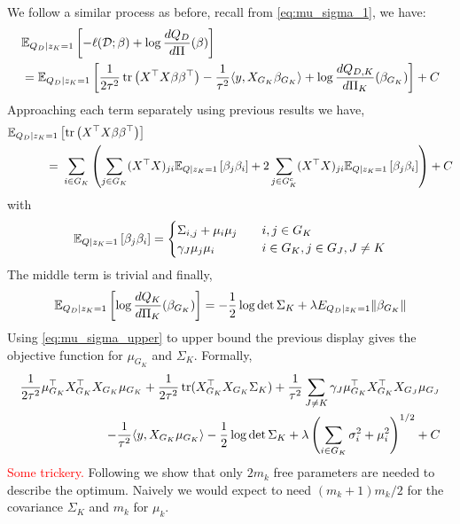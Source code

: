 \documentclass[12pt]{article}
\renewcommand{\red}[1]{\textcolor{red}{#1}}
\begin{document}
We follow a similar process as before, recall from \eqref{eq:mu_sigma_1}, we have:
{\allowdisplaybreaks
\begin{align}
& \mathbb{E}_{Q_D  | z_K = 1}  \left[ 
    - \ell(\mathcal{D}; \beta) + \log \frac{dQ_D}{d\Pi}(\beta) 
\right]  \nonumber \\
& = 
    \mathbb{E}_{Q_D | z_K = 1} \left[ 
	\frac{1}{2\tau^2} \operatorname{tr} \left( X^\top X \beta \beta^\top \right) 
	- \frac{1}{\tau^2} \langle y, X_{G_K} \beta_{G_K} \rangle 
	+ \log \frac{dQ_{D,K}}{d\Pi_K}(\beta_{G_K})
    \right] + C \label{eq:QD_mu_sigma}
\end{align}
}
Approaching each term separately using previous results we have,
\begin{align}
    \mathbb{E}_{Q_D | z_K = 1} & \left[ 
	\operatorname{tr} \left( X^\top X \beta \beta^\top \right) 
    \right] \\
=&\
    \sum_{i \in G_K} \left( 
	\sum_{j \in G_K} (X^\top X)_{ji} 
	    \mathbb{E}_{Q | z_K = 1} \left[ \beta_j \beta_i \right] 
	+ 
	2 \sum_{j \in G_K^c} (X^\top X)_{ji} 
	    \mathbb{E}_{Q | z_K = 1} \left[ \beta_j \beta_i \right] 
    \right ) + C \nonumber
\end{align}
with
\begin{equation}
    \mathbb{E}_{Q | z_K = 1} \left[ \beta_j \beta_i \right] = \begin{cases}
	\Sigma_{i, j} + \mu_{i} \mu_{j} & \quad i,j \in G_K \\
	\gamma_J \mu_{j}\mu_{i} 	& \quad i \in G_K, j \in G_J, J \neq K
    \end{cases}
\end{equation}
The middle term is trivial and finally,
\begin{equation}
    \mathbb{E}_{Q_D | z_K = 1 } \left[ \log \frac{dQ_K}{d\Pi_K} (\beta_{G_K}) \right]
    = -\frac{1}{2} \log \det \Sigma_K + \lambda E_{Q_D | z_K = 1} \| \beta_{G_K} \|
\end{equation}
Using \eqref{eq:mu_sigma_upper} to upper bound the previous display gives the objective function for $\mu_{G_K}$ and $\Sigma_K$. Formally,
\begin{equation} \label{eq:QD_mu_sigma_obj}
\begin{aligned}
    \frac{1}{2\tau^2} 
    \mu_{G_K}^\top X_{G_K}^\top X_{G_K} \mu_{G_K}
+
    \frac{1}{2\tau^2} 
    \operatorname{tr}( X_{G_K}^\top X_{G_K} \Sigma_K)
+
    \frac{1}{\tau^2} 
    \sum_{J \neq K} 
	\gamma_J \mu_{G_K}^\top X_{G_K}^\top X_{G_J} \mu_{G_J} \\
-
    \frac{1}{\tau^2}
    \langle y, X_{G_K} \mu_{G_K} \rangle 
-	
    \frac{1}{2} \log \det \Sigma_K 
+
    \lambda \left( \sum_{i \in G_K} 
	\sigma_i^2 + \mu_i^2
    \right)^{1/2} + C
\end{aligned}
\end{equation}
\red{Some trickery.} Following \citep[pg. 119]{Seeger1999} we show that only $2m_k$ free parameters are needed to describe the optimum. Naively we would expect to need $(m_k + 1)m_k /2 $ for the covariance $\Sigma_K$ and $m_k$ for $\mu_k$. 
\end{document}
